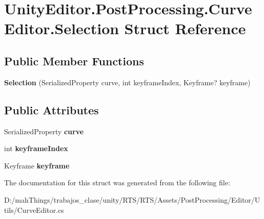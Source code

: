 \hypertarget{struct_unity_editor_1_1_post_processing_1_1_curve_editor_1_1_selection}{}\section{Unity\+Editor.\+Post\+Processing.\+Curve\+Editor.\+Selection Struct Reference}
\label{struct_unity_editor_1_1_post_processing_1_1_curve_editor_1_1_selection}
\subsection*{Public Member Functions}
\begin{DoxyCompactItemize}
\item 
\mbox{\label{struct_unity_editor_1_1_post_processing_1_1_curve_editor_1_1_selection_aec7d22cb022a0018f74986c6e7dee9dd}} 
{\bfseries Selection} (Serialized\+Property curve, int keyframe\+Index, Keyframe? keyframe)
\end{DoxyCompactItemize}
\subsection*{Public Attributes}
\begin{DoxyCompactItemize}
\item 
\mbox{\label{struct_unity_editor_1_1_post_processing_1_1_curve_editor_1_1_selection_a1e1a968fd45439d25970a792a4b6507c}} 
Serialized\+Property {\bfseries curve}
\item 
\mbox{\label{struct_unity_editor_1_1_post_processing_1_1_curve_editor_1_1_selection_aa592863c4ef55aa09ca57ac7b5b9fbe5}} 
int {\bfseries keyframe\+Index}
\item 
\mbox{\label{struct_unity_editor_1_1_post_processing_1_1_curve_editor_1_1_selection_a15a30ec45b9899c209e56e18b6f19a1f}} 
Keyframe {\bfseries keyframe}
\end{DoxyCompactItemize}


The documentation for this struct was generated from the following file\+:\begin{DoxyCompactItemize}
\item 
D\+:/mah\+Things/trabajos\+\_\+clase/unity/\+R\+T\+S/\+R\+T\+S/\+Assets/\+Post\+Processing/\+Editor/\+Utils/Curve\+Editor.\+cs\end{DoxyCompactItemize}
